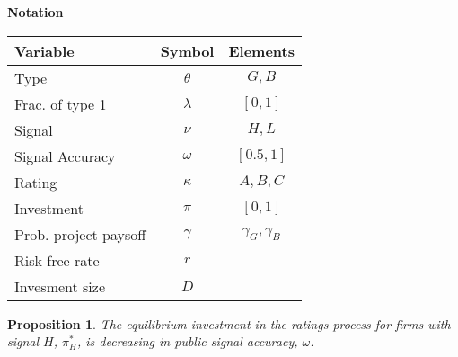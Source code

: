 \documentclass{report}
\newtheorem{proposition}{Proposition}
\begin{document}
\textbf{Notation}

\begin{tabular}{l c c}
\toprule
Variable&Symbol&Elements\\
\midrule
Type&$\theta$		&$G,B$\\
Frac. of type 1&$\lambda$&$\left[0,1\right]$\\
Signal&$\nu$		&$H,L$\\
Signal Accuracy&$\omega$&$\left[0.5,1\right]$\\
Rating&$\kappa$	&$A,B,C$\\
Investment&$\pi$	&$\left[0,1\right]$\\
Prob. project paysoff&$\gamma$&$\gamma_G,\gamma_B$\\
Risk free rate&$r$&\\
Invesment size&$D$&\\
\bottomrule
\end{tabular}

\begin{proposition}
The equilibrium investment in the ratings process for firms with signal $H$, $\pi^{*}_{H}$,  is decreasing in public signal accuracy, $\omega$.
\end{proposition}
\end{document}
